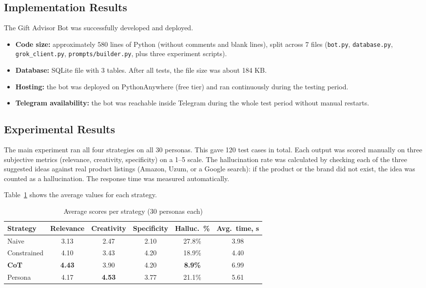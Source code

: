 \subsection{Implementation Results}

The Gift Advisor Bot was successfully developed and deployed.

\begin{itemize}
    \item \textbf{Code size:} approximately 580 lines of Python (without comments and blank lines), split across 7 files (\texttt{bot.py}, \texttt{database.py}, \texttt{grok\_client.py}, \texttt{prompts/builder.py}, plus three experiment scripts).
    \item \textbf{Database:} SQLite file with 3 tables. After all tests, the file size was about 184 KB.
    \item \textbf{Hosting:} the bot was deployed on PythonAnywhere (free tier) and ran continuously during the testing period.
    \item \textbf{Telegram availability:} the bot was reachable inside Telegram during the whole test period without manual restarts.
\end{itemize}



\subsection{Experimental Results}

The main experiment ran all four strategies on all 30 personas. This gave 120 test cases in total. Each output was scored manually on three subjective metrics (relevance, creativity, specificity) on a 1--5 scale. The hallucination rate was calculated by checking each of the three suggested ideas against real product listings (Amazon, Uzum, or a Google search): if the product or the brand did not exist, the idea was counted as a hallucination. The response time was measured automatically.

Table~\ref{tab:results-summary} shows the average values for each strategy.

\begin{table}[H]
\centering
\caption{Average scores per strategy (30 personas each)}
\label{tab:results-summary}
\begin{tabular}{lccccc}
\toprule
\textbf{Strategy} & \textbf{Relevance} & \textbf{Creativity} & \textbf{Specificity} & \textbf{Halluc.\ \%} & \textbf{Avg.\ time, s} \\
\midrule
Naive       & 3.13 & 2.47 & 2.10 & 27.8\% & 3.98 \\
Constrained & 4.10 & 3.43 & 4.20 & 18.9\% & 4.40 \\
\textbf{CoT}         & \textbf{4.43} & 3.90 & 4.20 & \textbf{8.9\%}  & 6.99 \\
Persona     & 4.17 & \textbf{4.53} & 3.77 & 21.1\% & 5.61 \\
\bottomrule
\end{tabular}
\end{table}

